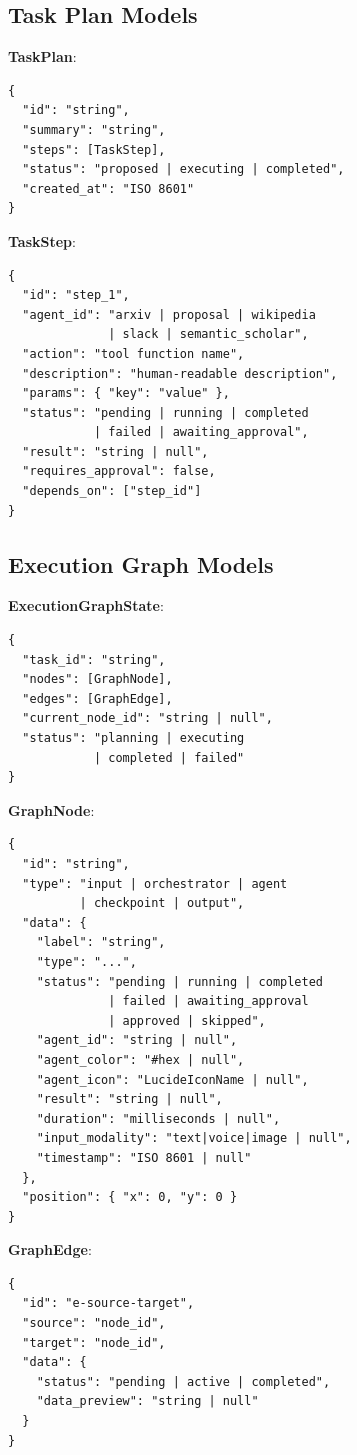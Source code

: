 \documentclass[sigconf, anonymous]{acmart}
\begin{document}
\subsection{Task Plan Models}

\textbf{TaskPlan}:
{\small
\begin{verbatim}
{
  "id": "string",
  "summary": "string",
  "steps": [TaskStep],
  "status": "proposed | executing | completed",
  "created_at": "ISO 8601"
}
\end{verbatim}
}

\textbf{TaskStep}:
{\small
\begin{verbatim}
{
  "id": "step_1",
  "agent_id": "arxiv | proposal | wikipedia
              | slack | semantic_scholar",
  "action": "tool function name",
  "description": "human-readable description",
  "params": { "key": "value" },
  "status": "pending | running | completed
            | failed | awaiting_approval",
  "result": "string | null",
  "requires_approval": false,
  "depends_on": ["step_id"]
}
\end{verbatim}
}

\subsection{Execution Graph Models}

\textbf{ExecutionGraphState}:
{\small
\begin{verbatim}
{
  "task_id": "string",
  "nodes": [GraphNode],
  "edges": [GraphEdge],
  "current_node_id": "string | null",
  "status": "planning | executing
            | completed | failed"
}
\end{verbatim}
}

\textbf{GraphNode}:
{\small
\begin{verbatim}
{
  "id": "string",
  "type": "input | orchestrator | agent
          | checkpoint | output",
  "data": {
    "label": "string",
    "type": "...",
    "status": "pending | running | completed
              | failed | awaiting_approval
              | approved | skipped",
    "agent_id": "string | null",
    "agent_color": "#hex | null",
    "agent_icon": "LucideIconName | null",
    "result": "string | null",
    "duration": "milliseconds | null",
    "input_modality": "text|voice|image | null",
    "timestamp": "ISO 8601 | null"
  },
  "position": { "x": 0, "y": 0 }
}
\end{verbatim}
}

\textbf{GraphEdge}:
{\small
\begin{verbatim}
{
  "id": "e-source-target",
  "source": "node_id",
  "target": "node_id",
  "data": {
    "status": "pending | active | completed",
    "data_preview": "string | null"
  }
}
\end{verbatim}
}
\end{document}
